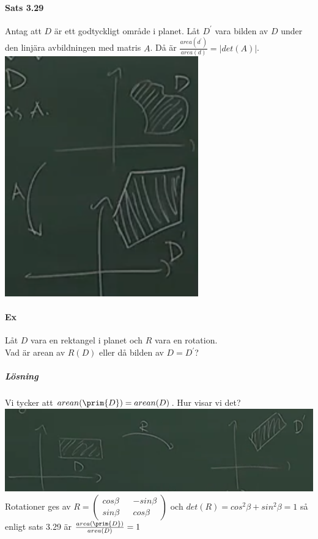 \paragraph{Sats 3.29} Antag att $D$ är ett godtyckligt område i planet.
Låt $D^{\prime}$ vara bilden av $D$ under den linjära avbildningen med matris $A$.
Då är $\frac{area(d^{\prime})}{area(d)}=|det(A)|$.\\
\includegraphics[scale=0.5]{imgs/img03.png}

\paragraph{Ex} Låt $D$ vara en rektangel i planet och $R$ vara en rotation.\\
Vad är arean av $R(D)$ eller då bilden av $D=D^{\prime}$?
\subparagraph{Lösning} Vi tycker att $arean(\prim{D})=arean(D)$.
Hur visar vi det?\\
\includegraphics[scale=0.5]{imgs/img04.png}\\
Rotationer ges av $R=\begin{pmatrix}
    cos\beta&&-sin\beta\\
    sin\beta&&cos\beta
\end{pmatrix}$ och $det(R)=cos^{2}\beta+sin^{2}\beta=1$ så enligt sats 3.29 är $\frac{area(\prim{D})}{area(D)}=1$

